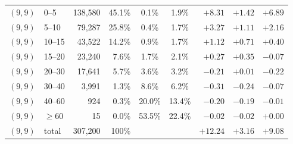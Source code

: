 \begin{tabular}{ll|rr|cc|rrr}
\hline
$(9, 9)$ & 0--5 & 138,580 & 45.1\% & 0.1\% & 1.9\% & $+8.31$ & $+1.42$ & $+6.89$ \\
$(9, 9)$ & 5--10 & 79,287 & 25.8\% & 0.4\% & 1.7\% & $+3.27$ & $+1.11$ & $+2.16$ \\
$(9, 9)$ & 10--15 & 43,522 & 14.2\% & 0.9\% & 1.7\% & $+1.12$ & $+0.71$ & $+0.40$ \\
$(9, 9)$ & 15--20 & 23,240 & 7.6\% & 1.7\% & 2.1\% & $+0.27$ & $+0.35$ & $-0.07$ \\
$(9, 9)$ & 20--30 & 17,641 & 5.7\% & 3.6\% & 3.2\% & $-0.21$ & $+0.01$ & $-0.22$ \\
$(9, 9)$ & 30--40 & 3,991 & 1.3\% & 8.6\% & 6.2\% & $-0.31$ & $-0.24$ & $-0.07$ \\
$(9, 9)$ & 40--60 & 924 & 0.3\% & 20.0\% & 13.4\% & $-0.20$ & $-0.19$ & $-0.01$ \\
$(9, 9)$ & $\geq 60$ & 15 & 0.0\% & 53.5\% & 22.4\% & $-0.02$ & $-0.02$ & $+0.00$ \\
$(9, 9)$ & total & 307,200 & 100\% & & & $+12.24$ & $+3.16$ & $+9.08$ \\
\bottomrule
\end{tabular}

